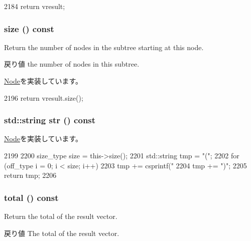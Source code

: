 \begin{DoxyCode}
2184 { return vresult; }
\end{DoxyCode}
\hypertarget{classStats_1_1ConstVectorNode_a503ab01f6c0142145d3434f6924714e7}{
\subsubsection[{size}]{ size () const}}
\label{classStats_1_1ConstVectorNode_a503ab01f6c0142145d3434f6924714e7}
Return the number of nodes in the subtree starting at this node. \begin{DoxyReturn}{戻り値}
the number of nodes in this subtree. 
\end{DoxyReturn}


\hyperlink{classStats_1_1Node_a4051d143efd31726fa13df03ae4e1bce}{Node}を実装しています。


\begin{DoxyCode}
2196 { return vresult.size(); }
\end{DoxyCode}
\hypertarget{classStats_1_1ConstVectorNode_a1b9b8885b0880fc4ddf9a2c7d1ca3dc4}{
\subsubsection[{str}]{\setlength{\rightskip}{0pt plus 5cm}std::string str () const}}
\label{classStats_1_1ConstVectorNode_a1b9b8885b0880fc4ddf9a2c7d1ca3dc4}


\hyperlink{classStats_1_1Node_a6522bc65bd97a6b1ef6cdfe78462a919}{Node}を実装しています。


\begin{DoxyCode}
2199     {
2200         size_type size = this->size();
2201         std::string tmp = "(";
2202         for (off_type i = 0; i < size; i++)
2203             tmp += csprintf("%
2204         tmp += ")";
2205         return tmp;
2206     }
\end{DoxyCode}
\hypertarget{classStats_1_1ConstVectorNode_a35c6e2ed3fc81b40d69052a062113ead}{
\subsubsection[{total}]{ total () const}}
\label{classStats_1_1ConstVectorNode_a35c6e2ed3fc81b40d69052a062113ead}
Return the total of the result vector. \begin{DoxyReturn}{戻り値}
The total of the result vector. 
\end{DoxyReturn}


